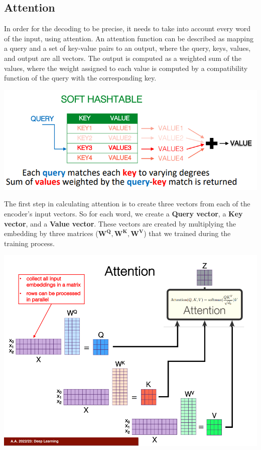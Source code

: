 \subsection{Attention}
In order for the decoding to be precise, it needs to take into account every word of the input, using attention.\newline\newline
An attention function can be described as mapping a query and a set of key-value pairs to an output, where the query, keys, values, and output are all vectors. The output is computed as a weighted sum of the values, where the weight assigned to each value is computed by a compatibility function of the query with the corresponding key.
\begin{center}
    \includegraphics[scale=0.8]{images/attention.png}
\end{center}
The first step in calculating attention is to create three vectors from each of the encoder’s input vectors. So for each word, we create a \textbf{Query vector}, a \textbf{Key vector}, and a \textbf{Value vector}. These vectors are created by multiplying the embedding by three matrices ($\textbf{W}^\textbf{Q}, \textbf{W}^\textbf{K}, \textbf{W}^\textbf{V}$) that we trained during the training process.
\begin{center}
    \includegraphics[scale=0.6]{images/attention 2.png}
\end{center}
